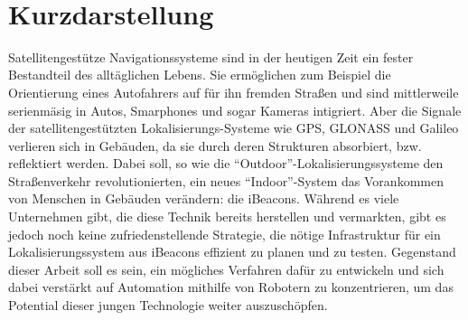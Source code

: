 \maketitle 
\newpage\thispagestyle{empty}~
\newpage

\chapter*{Kurzdarstellung}
Satellitengestütze Navigationssysteme sind in der heutigen Zeit ein fester Bestandteil des alltäglichen Lebens. Sie ermöglichen zum Beispiel die Orientierung eines Autofahrers auf für ihn fremden Straßen und sind mittlerweile serienmäsig in Autos, Smarphones und sogar Kameras intigriert. Aber die Signale der satellitengestützten Lokalisierungs-Systeme wie GPS, GLONASS und Galileo verlieren sich in Gebäuden, da sie durch deren Strukturen absorbiert, bzw. reflektiert werden. Dabei soll, so wie die "`Outdoor"'-Lokalisierungssysteme den Straßenverkehr revolutionierten, ein neues "`Indoor"'-System das Vorankommen von Menschen in Gebäuden verändern: die iBeacons. Während es viele Unternehmen gibt, die diese Technik bereits herstellen und vermarkten, gibt es jedoch noch keine zufriedenstellende Strategie, die nötige Infrastruktur für ein Lokalisierungssystem aus iBeacons effizient zu planen und zu testen. Gegenstand dieser Arbeit soll es sein, ein mögliches Verfahren dafür zu entwickeln und sich dabei verstärkt auf Automation mithilfe von Robotern zu konzentrieren, um das Potential dieser jungen Technologie weiter auszuschöpfen.  